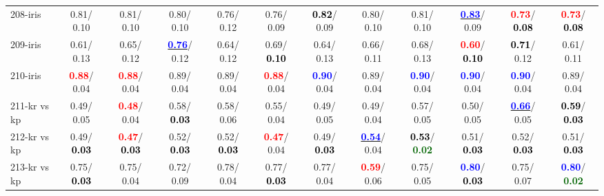 \begin{table}[h]
\begin{center}
{\begin{tabular}{lc|c|c|c|c|c|c|c|c|c|c}
208-iris &   0.81/  0.10 &   0.81/  0.10 &   0.80/  0.10 &   0.76/  0.12 &   0.76/  0.09 & \textcolor{black}{\textbf{  0.82}}/  0.09 &   0.80/  0.10 &   0.81/  0.10 & \underline{\textcolor{blue}{\textbf{  0.83}}}/  0.09 & \textcolor{red}{\textbf{  0.73}}/\textcolor{black}{\textbf{  0.08}} & \textcolor{red}{\textbf{  0.73}}/\textcolor{black}{\textbf{  0.08}} \\
209-iris &   0.61/  0.13 &   0.65/  0.12 & \underline{\textcolor{blue}{\textbf{  0.76}}}/  0.12 &   0.64/  0.12 &   0.69/\textcolor{black}{\textbf{  0.10}} &   0.64/  0.13 &   0.66/  0.11 &   0.68/  0.13 & \textcolor{red}{\textbf{  0.60}}/\textcolor{black}{\textbf{  0.10}} & \textcolor{black}{\textbf{  0.71}}/  0.12 &   0.61/  0.11 \\
210-iris & \textcolor{red}{\textbf{  0.88}}/  0.04 & \textcolor{red}{\textbf{  0.88}}/  0.04 &   0.89/  0.04 &   0.89/  0.04 & \textcolor{red}{\textbf{  0.88}}/  0.04 & \textcolor{blue}{\textbf{  0.90}}/  0.04 &   0.89/  0.04 & \textcolor{blue}{\textbf{  0.90}}/  0.04 & \textcolor{blue}{\textbf{  0.90}}/  0.04 & \textcolor{blue}{\textbf{  0.90}}/  0.04 &   0.89/  0.04 \\
211-kr vs kp &   0.49/  0.05 & \textcolor{red}{\textbf{  0.48}}/  0.04 &   0.58/\textcolor{black}{\textbf{  0.03}} &   0.58/  0.06 &   0.55/  0.04 &   0.49/  0.05 &   0.49/  0.04 &   0.57/  0.05 &   0.50/  0.05 & \underline{\textcolor{blue}{\textbf{  0.66}}}/  0.05 & \textcolor{black}{\textbf{  0.59}}/\textcolor{black}{\textbf{  0.03}} \\
212-kr vs kp &   0.49/\textcolor{black}{\textbf{  0.03}} & \textcolor{red}{\textbf{  0.47}}/\textcolor{black}{\textbf{  0.03}} &   0.52/\textcolor{black}{\textbf{  0.03}} &   0.52/\textcolor{black}{\textbf{  0.03}} & \textcolor{red}{\textbf{  0.47}}/  0.04 &   0.49/\textcolor{black}{\textbf{  0.03}} & \underline{\textcolor{blue}{\textbf{  0.54}}}/  0.04 & \textcolor{black}{\textbf{  0.53}}/\textcolor{darkgreen}{\textbf{  0.02}} &   0.51/\textcolor{black}{\textbf{  0.03}} &   0.52/\textcolor{black}{\textbf{  0.03}} &   0.51/\textcolor{black}{\textbf{  0.03}} \\
213-kr vs kp &   0.75/\textcolor{black}{\textbf{  0.03}} &   0.75/  0.04 &   0.72/  0.09 &   0.78/  0.04 &   0.77/\textcolor{black}{\textbf{  0.03}} &   0.77/  0.04 & \textcolor{red}{\textbf{  0.59}}/  0.06 &   0.75/  0.05 & \textcolor{blue}{\textbf{  0.80}}/\textcolor{black}{\textbf{  0.03}} &   0.75/  0.07 & \textcolor{blue}{\textbf{  0.80}}/\textcolor{darkgreen}{\textbf{  0.02}} \\ \hline

\end{tabular}}
\end{center}
\end{table}
